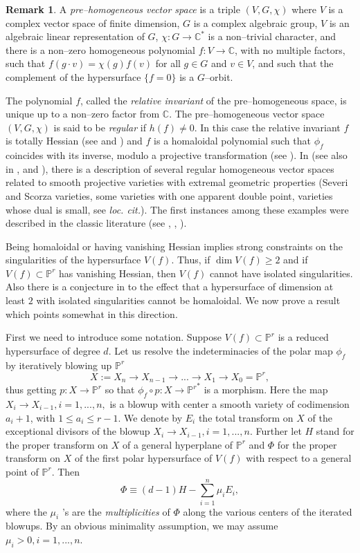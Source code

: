 \documentclass[11pt]{article}   %
\theoremstyle{definition}
\newtheorem{Remark}[Theorem]{Remark}
\numberwithin{Theorem}{section} \numberwithin{equation}{section}
\newcommand{\C}{{\mathbb C}}
\newcommand{\p}{{\mathbb P}}
\begin{document}
{\begin{Remark}
A {\it pre--homogeneous vector space\/} is a triple $(V,G,\chi)$
where $V$ is a complex vector space of finite dimension, $G$ is a
complex algebraic group, $V$ is an algebraic linear representation
of $G$, $\chi: G\to \C^*$ is a non--trivial character, and there is
a non--zero homogeneous polynomial $f: V\to \C$, with no multiple
factors, such that $f(g\cdot v)=\chi(g)f(v)$ for all $g\in G$ and $v\in
V$, and such that the complement of the hypersurface $\{f=0\}$ is a
$G$--orbit.


The polynomial $f$, called the {\it relative invariant\/} of the
pre--homogeneous space, is unique up to a non--zero factor from $\C$.
The pre--homogeneous vector space  $(V,G,\chi)$ is said to be {\it
regular\/} if $h(f)\neq 0$. In this case the relative invariant $f$
is totally Hessian (see \cite{KS} and \cite{ESB}) and $f$ is a
homaloidal polynomial such that $\phi_f$ coincides with its inverse,
modulo a projective transformation (see \cite[Theorem 2.8]{ESB}). In
\cite{EKP} (see also in \cite{Mukai}, \cite[Ch. III]{Zak1} and
\cite{ESB}), there is a description of several regular homogeneous
vector spaces related to smooth projective varieties with extremal
geometric properties (Severi and Scorza varieties, some varieties
with one apparent double point, varieties whose dual is small, see
{\it loc. cit.\/}). The first instances among these examples were
described in the classic literature (see \cite{Cayley},
\cite{Segre}, \cite{Fr1}).
\end{Remark}
\medskip

Being homaloidal or having vanishing Hessian implies strong
constraints on the singularities of the hypersurface $V(f)$.  Thus,
if $\dim V(f)\geq 2$ and if $V(f)\subset\p^r$ has vanishing Hessian, then $V(f)$ cannot have
isolated singularities. Also there is a conjecture in \cite{DP} to
the effect that a hypersurface of dimension at least $2$ with isolated
singularities cannot be homaloidal. We now prove a result which
points somewhat in this direction.

First we need to introduce some notation. Suppose $V(f)\subset\p^r$ is a
reduced hypersurface  of degree $d$. Let us resolve the
indeterminacies of the polar map $\phi_f$ by iteratively blowing up
$\p^ r$
$$X:=X_n\to X_{n-1}\to... \to X_1\to X_0=\p^ r,$$
thus getting $p: X\to \p^ r$ so that $\phi_f\circ p: X\to {\p^ r}^
*$ is a morphism. Here the map $X_i\to X_{i-1}, i=1,...,n,$ is a blowup with
center a smooth variety of codimension $a_i+1$, with $1\leq a_i\leq
r-1$. We denote by $E_i$ the total transform on $X$ of the
exceptional divisors of the blowup $X_i\to X_{i-1}, i=1,...,n$.
Further let $H$ stand for the proper transform on $X$ of a general
hyperplane of $\p^r$ and $\Phi$ for the proper transform on $X$ of
the first polar hypersurface of $V(f)$ with respect to a general
point of $\p^r$. Then
$$\Phi\equiv (d-1)H-\sum_{i=1}^ n \mu_iE_i,$$
where the $\mu_i$ 's are the {\it multiplicities\/} of $\Phi$ along
the various centers of the iterated blowups. By an obvious
minimality assumption, we may assume $\mu_i>0, i=1,...,n$.

}
\end{document}
